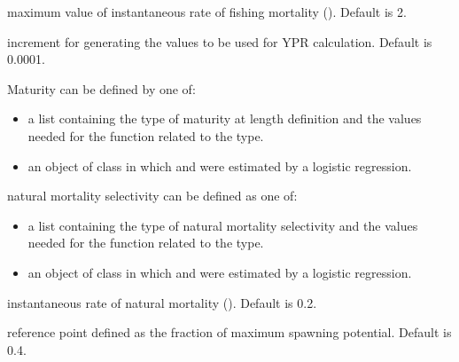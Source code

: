 \documentclass[a4paper]{book}
\begin{document}
\begin{Arguments}
\begin{ldescription}
\item[\code{F.max}] maximum value of instantaneous rate of fishing mortality (). Default is 2.

\item[\code{F.incr.YPR}] increment for generating the  values to be used for YPR calculation. Default is 0.0001.

\item[\code{Mat}] Maturity can be defined by one of:
\begin{itemize}

\item a list containing the type of maturity at length definition and the values needed for the function related to the type.
\item an object of class  in which \eqn{\alpha}{} and \eqn{\beta}{} were estimated by a logistic regression.       

\end{itemize}


\item[\code{Msel.type}] natural mortality selectivity can be defined as one of:
\begin{itemize}

\item a list containing the type of natural mortality selectivity and the values needed for the function related to the type. 
\item an object of class  in which \eqn{\alpha}{} and \eqn{\beta}{} were estimated by a logistic regression.       

\end{itemize}


\item[\code{M}] instantaneous rate of natural mortality (). Default is 0.2.

\item[\code{f.MSP}] reference point defined as the fraction of maximum spawning potential. Default is 0.4.







\end{ldescription}
\end{Arguments}
%
\end{document}
